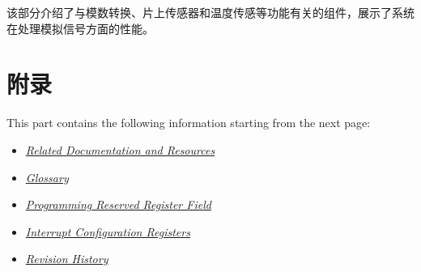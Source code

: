 \documentclass[openany, 10pt]{book}
\begin{document}
该部分介绍了与模数转换、片上传感器和温度传感等功能有关的组件，展示了系统在处理模拟信号方面的性能。



\part{附录}\label{appendix}

This part contains the following information starting from the next page:

\begin{itemize}
    \item \hyperref[sec:resources]{\textit{Related Documentation and Resources}}
    \item \hyperref[glossary]{\textit{Glossary}}
    \item \hyperref[programming-reserved-field]{\textit{Programming Reserved Register Field}}
    \item \hyperref[interrupt-config-registers]{\textit{Interrupt Configuration Registers}}
    \item \hyperref[revision-history]{\textit{Revision History}}
\end{itemize}


\clearpage


\clearpage


\clearpage


\clearpage


\clearpage


\clearpage

\end{document}
